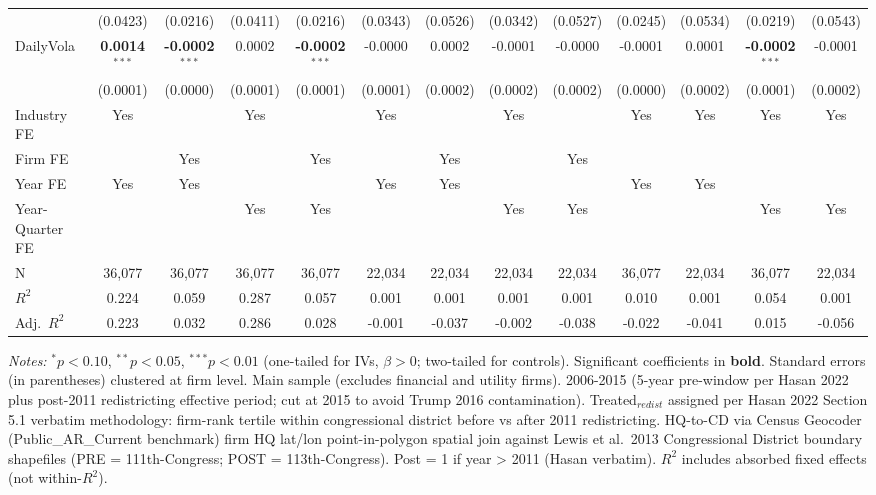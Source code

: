 \documentclass[11pt,a4paper]{article}
\begin{document}
\begin{table}[htbp]
\begin{tabular}{lcccccccccccc}
 & (0.0423) & (0.0216) & (0.0411) & (0.0216) & (0.0343) & (0.0526) & (0.0342) & (0.0527) & (0.0245) & (0.0534) & (0.0219) & (0.0543) \\
DailyVola & \textbf{0.0014}$^{***}$ & \textbf{-0.0002}$^{***}$ & 0.0002 & \textbf{-0.0002}$^{***}$ & -0.0000 & 0.0002 & -0.0001 & -0.0000 & -0.0001 & 0.0001 & \textbf{-0.0002}$^{***}$ & -0.0001 \\
 & (0.0001) & (0.0000) & (0.0001) & (0.0001) & (0.0001) & (0.0002) & (0.0002) & (0.0002) & (0.0000) & (0.0002) & (0.0001) & (0.0002) \\
\midrule
Industry FE & Yes &  & Yes &  & Yes &  & Yes &  & Yes & Yes & Yes & Yes \\
Firm FE &  & Yes &  & Yes &  & Yes &  & Yes &  &  &  &  \\
Year FE & Yes & Yes &  &  & Yes & Yes &  &  & Yes & Yes &  &  \\
Year-Quarter FE &  &  & Yes & Yes &  &  & Yes & Yes &  &  & Yes & Yes \\
\midrule
N & 36,077 & 36,077 & 36,077 & 36,077 & 22,034 & 22,034 & 22,034 & 22,034 & 36,077 & 22,034 & 36,077 & 22,034 \\
$R^2$ & 0.224 & 0.059 & 0.287 & 0.057 & 0.001 & 0.001 & 0.001 & 0.001 & 0.010 & 0.001 & 0.054 & 0.001 \\
Adj.~$R^2$ & 0.223 & 0.032 & 0.286 & 0.028 & -0.001 & -0.037 & -0.002 & -0.038 & -0.022 & -0.041 & 0.015 & -0.056 \\
\bottomrule
\end{tabular}
\begin{minipage}{\linewidth}
\vspace{2pt}\scriptsize
\textit{Notes:} $^{*}p<0.10$, $^{**}p<0.05$, $^{***}p<0.01$ (one-tailed for IVs, $\beta > 0$; two-tailed for controls).
 Significant coefficients in \textbf{bold}.
 Standard errors (in parentheses) clustered at firm level.
 Main sample (excludes financial and utility firms). 2006-2015 (5-year pre-window per Hasan 2022 plus post-2011 redistricting effective period; cut at 2015 to avoid Trump 2016 contamination). Treated$_{redist}$ assigned per Hasan 2022 Section 5.1 verbatim methodology: firm-rank tertile within congressional district before vs after 2011 redistricting. HQ-to-CD via Census Geocoder (Public\_AR\_Current benchmark) firm HQ lat/lon point-in-polygon spatial join against Lewis et al.\ 2013 Congressional District boundary shapefiles (PRE = 111th-Congress; POST = 113th-Congress). Post = 1 if year > 2011 (Hasan verbatim).
 $R^2$ includes absorbed fixed effects (not within-$R^2$).
\end{minipage}
\end{table}
\end{document}
